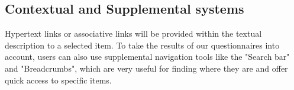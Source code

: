 \subsection{Contextual and Supplemental systems}
Hypertext links or associative links will be provided within the textual description to a selected item. 
To take the results of our questionnaires into account, users can also use supplemental navigation tools like the "Search bar" and "Breadcrumbs", which are very useful for finding where they are and offer quick access to specific items.


